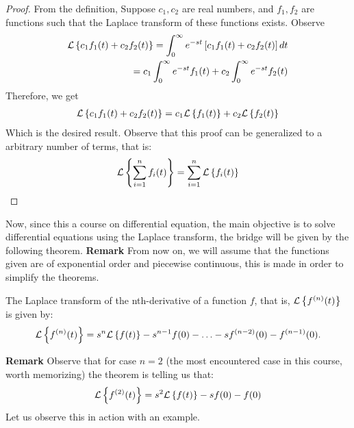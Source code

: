 \begin{proof}
	From the definition, Suppose $c_1,c_2$ are real numbers, and $f_1,f_2$ are functions such that the Laplace transform of these functions exists. Observe
	\begin{align*}
	\mathcal{L}\left\lbrace c_1f_1(t) + c_2f_2(t) \right\rbrace = \int_0^\infty e^{-st} \left[ c_1f_1(t) + c_2f_2(t) \right]dt \\
	= c_1 \int_0^\infty e^{-st}f_1(t) + c_2 \int_0^\infty e^{-st}f_2(t)
	\end{align*}
	Therefore, we get
	\begin{align*}
	\mathcal{L}\left\lbrace c_1f_1(t) + c_2f_2(t) \right\rbrace = c_1\mathcal{L}\left\lbrace f_1(t) \right\rbrace + c_2\mathcal{L}\left\lbrace f_2(t) \right\rbrace
	\end{align*}
	Which is the desired result.
	Observe that this proof can be generalized to a arbitrary number of terms, that is:
	\begin{align*}
	\mathcal{L}\left\lbrace \sum_{i = 1}^{n} f_i(t) \right\rbrace = \sum_{i = 1}^{n} \mathcal{L}\left\lbrace f_i(t) \right\rbrace
	\end{align*}
\end{proof}
Now, since this a course on differential equation, the main objective is to solve differential equations using the Laplace transform, the bridge will be given by the following theorem. \newline
\textbf{Remark} From now on, we will assume that the functions given are of exponential order and piecewise continuous, this is made in order to simplify the theorems.
\begin{thm}
	The Laplace transform of the nth-derivative of a function $f$, that is, $ \mathcal{L}\left\lbrace f^{(n)} (t) \right\rbrace $ is given by:
	\begin{align*}
	\mathcal{L}\left\lbrace f^{(n)} (t) \right\rbrace = s^n \mathcal{L}\left\lbrace f(t) \right\rbrace - s^{n-1}f(0) - \ldots -sf^{(n-2)}(0) - f^{(n-1)}(0).
	\end{align*}
\end{thm} 
\textbf{Remark} Observe that for case $n=2$ (the most encountered case in this course, worth memorizing) the theorem is telling us that:
\begin{align*}
\mathcal{L}\left\lbrace f^{(2)} (t) \right\rbrace = s^2\mathcal{L}\left\lbrace f(t) \right\rbrace - sf(0) - f(0)
\end{align*}
Let us observe this in action with an example.
